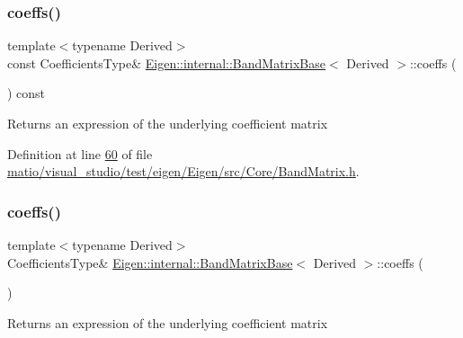 \subsubsection{\texorpdfstring{coeffs()}{coeffs()}\hspace{0.1cm}{\footnotesize\ttfamily [2/4]}}
{\footnotesize\ttfamily template$<$typename Derived$>$ \\
const Coefficients\+Type\& \hyperlink{class_eigen_1_1internal_1_1_band_matrix_base}{Eigen\+::internal\+::\+Band\+Matrix\+Base}$<$ Derived $>$\+::coeffs (\begin{DoxyParamCaption}{ }\end{DoxyParamCaption}) const\hspace{0.3cm}{\ttfamily [inline]}}

\begin{DoxyReturn}{Returns}
an expression of the underlying coefficient matrix 
\end{DoxyReturn}


Definition at line \hyperlink{matio_2visual__studio_2test_2eigen_2_eigen_2src_2_core_2_band_matrix_8h_source_l00060}{60} of file \hyperlink{matio_2visual__studio_2test_2eigen_2_eigen_2src_2_core_2_band_matrix_8h_source}{matio/visual\+\_\+studio/test/eigen/\+Eigen/src/\+Core/\+Band\+Matrix.\+h}.

\mbox{\label{class_eigen_1_1internal_1_1_band_matrix_base_ab296a77fa3ac9c7618957b01c7de0a35}} 
\subsubsection{\texorpdfstring{coeffs()}{coeffs()}\hspace{0.1cm}{\footnotesize\ttfamily [3/4]}}
{\footnotesize\ttfamily template$<$typename Derived$>$ \\
Coefficients\+Type\& \hyperlink{class_eigen_1_1internal_1_1_band_matrix_base}{Eigen\+::internal\+::\+Band\+Matrix\+Base}$<$ Derived $>$\+::coeffs (\begin{DoxyParamCaption}{ }\end{DoxyParamCaption})\hspace{0.3cm}{\ttfamily [inline]}}

\begin{DoxyReturn}{Returns}
an expression of the underlying coefficient matrix 
\end{DoxyReturn}


